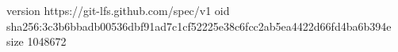 version https://git-lfs.github.com/spec/v1
oid sha256:3c3b6bbadb00536dbf91ad7c1cf52225e38c6fcc2ab5ea4422d66fd4ba6b394e
size 1048672
